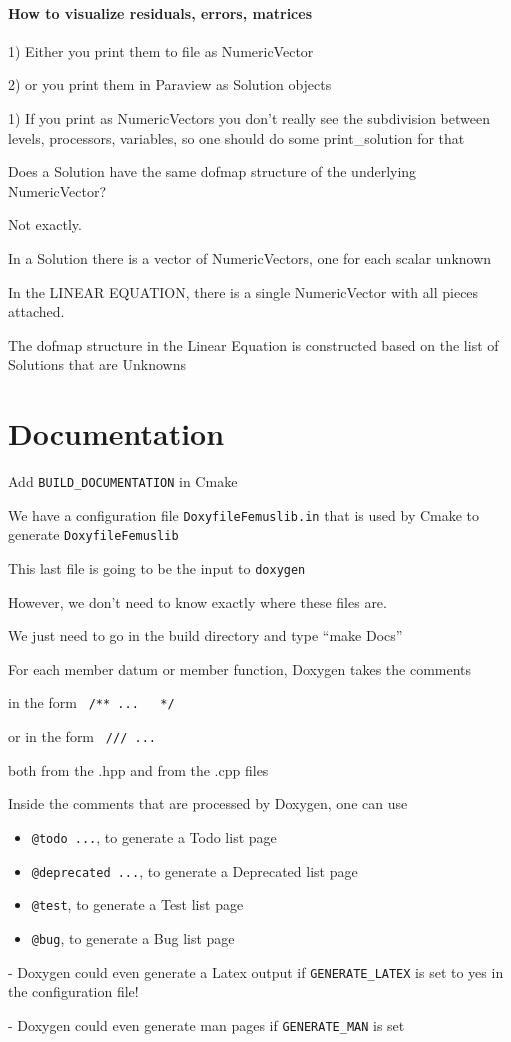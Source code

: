 \documentclass[10pt]{book}
\begin{document}
  \subsubsection{How to visualize residuals, errors, matrices}
  
 1)  Either you print them to file as NumericVector
  
 2)  or you print them in Paraview as Solution objects
  
  1) If you print as NumericVectors you don't really see the subdivision between levels, processors, variables,
     so one should do some print\_solution for that
     
     
     Does a Solution have the same dofmap structure of the underlying NumericVector?
     
     Not exactly.
     
     In a Solution there is a vector of NumericVectors, one for each scalar unknown
     
     In the LINEAR EQUATION, there is a single NumericVector with all pieces attached.
     
     The dofmap structure in the Linear Equation is constructed based on the list of Solutions that are Unknowns
     
  
  

  \chapter{Documentation}
  
  Add \verb|BUILD_DOCUMENTATION| in Cmake
  
  We have a configuration file \verb|DoxyfileFemuslib.in|
  that is used by Cmake to generate \verb|DoxyfileFemuslib|
  
  This last file is going to be the input to \verb|doxygen|
  
  However, we don't need to know exactly where these files are.
  
  We just need to go in the build directory and type ``make Docs''
  
  For each member datum or member function, 
   Doxygen takes the comments 
   
    in the form \verb| /** ...   */ |
    
    or in the form \verb| /// ... |
    
    both from the .hpp and from the .cpp files
  
    Inside the comments that are processed by Doxygen, one can use 
    \begin{itemize}
     \item 
        \verb|@todo ...|, to generate a Todo list page
     \item 
        \verb|@deprecated ...|, to generate a Deprecated list page
     \item 
        \verb|@test|, to generate a Test list page
     \item 
        \verb|@bug|, to generate a Bug list page
    \end{itemize}
  

    
    - Doxygen could even generate a Latex output if \verb|GENERATE_LATEX| is set to yes in the configuration file!

  - Doxygen could even generate man pages if \verb|GENERATE_MAN| is set
  
  
  
\end{document}
